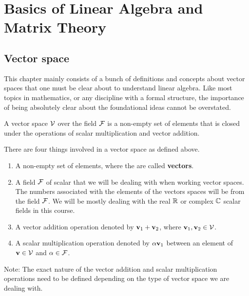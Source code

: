 
\chapter{Basics of Linear Algebra and Matrix Theory}

\section{Vector space}

This chapter mainly consists of a bunch of definitions and concepts about vector spaces that one must be clear about to understand linear algebra. Like most topics in mathematics, or any discipline with a formal structure, the importance of being absolutely clear about the foundational ideas cannot be overstated.

\begin{definition}[frametitle=Vector Space]
A vector space $\mathcal{V}$ over the field $\mathcal{F}$ is a non-empty set of elements that is closed under the operations of scalar multiplication and vector addition.
\end{definition}

There are four things involved in a vector space as defined above.
\begin{enumerate}
    \item A non-empty set of elements, where the are called \textbf{vectors}.
    \item A field $\mathcal{F}$ of scalar that we will be dealing with when working vector spaces. The numbers associated with the elements of the vectors spaces will be from the field $\mathcal{F}$. We will be mostly dealing with the real $\mathbb{R}$ or complex $\mathbb{C}$ scalar fields in this course.  
    \item A vector addition operation denoted by $\mathbf{v}_1 + \mathbf{v}_2$, where $\mathbf{v}_1, \mathbf{v}_2 \in \mathcal{V}$.
    \item A scalar multiplication operation denoted by $\alpha \mathbf{v}_1$ between an element of $\mathbf{v} \in \mathcal{V}$ and $\alpha \in \mathcal{F}$. 
\end{enumerate}
Note: The exact nature of the vector addition and scalar multiplication operations need to be defined depending on the type of vector space we are dealing with. 

